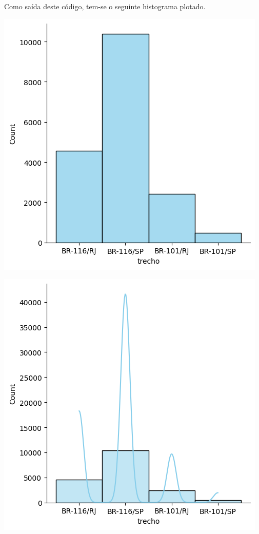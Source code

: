 \documentclass[a4paper, 12pt]{article}
\begin{document}
Como saída deste código, tem-se o seguinte histograma plotado.

\includegraphics[scale=0.7]{output04.png}

\includegraphics[scale=0.7]{output05.png}
\end{document}
